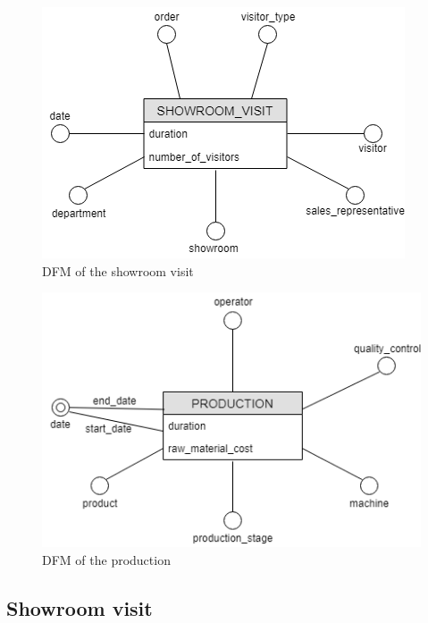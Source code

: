\documentclass[letterpaper,12pt]{article}
\begin{document}
\begin{figure}[H] 
        \centering
        \includegraphics[scale=0.65]{../images/DFM_Showroom_Simple.png}
        \caption{
                \label{fig:showroom}  
                DFM of the showroom visit
        }
\end{figure}

\begin{figure}[H] 
        \centering
        \includegraphics[scale=0.65]{../images/DFM_Production_Simple.png}
        \caption{
                \label{fig:production}  
                DFM of the production
        }
\end{figure}

\subsection{Showroom visit}
\end{document}
